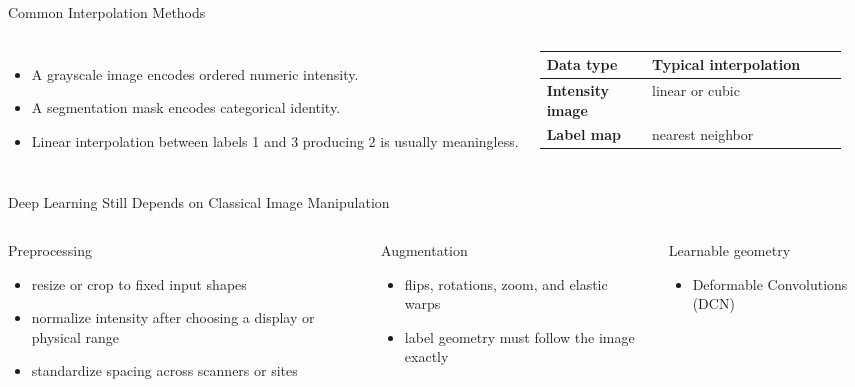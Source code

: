 \documentclass[aspectratio=169,10pt]{beamer}
\begin{document}
\begin{frame}{Common Interpolation Methods}
\begin{columns}[T,onlytextwidth]
\begin{itemize}
\item A grayscale image encodes ordered numeric intensity.
\item A segmentation mask encodes categorical identity.
\item Linear interpolation between labels 1 and 3 producing 2 is usually meaningless.
\end{itemize}

\small
\begin{tabularx}{\linewidth}{>{\bfseries}p{0.35\linewidth} X}
\toprule
Data type & Typical interpolation \\
\midrule
Intensity image & linear or cubic \\
Label map & nearest neighbor \\
\bottomrule
\end{tabularx}
\end{columns}
\end{frame}



\begin{frame}{Deep Learning Still Depends on Classical Image Manipulation}
\begin{columns}[T,onlytextwidth]
\begin{block}{Preprocessing}
\begin{itemize}
\item resize or crop to fixed input shapes
\item normalize intensity after choosing a display or physical range
\item standardize spacing across scanners or sites
\end{itemize}
\end{block}

\begin{block}{Augmentation}
\begin{itemize}
\item flips, rotations, zoom, and elastic warps
\item label geometry must follow the image exactly
\end{itemize}
\end{block}

\begin{block}{Learnable geometry}
\begin{itemize}
\item Deformable Convolutions (DCN)
\end{itemize}
\end{block}
\end{columns}
\end{frame}
\end{document}
